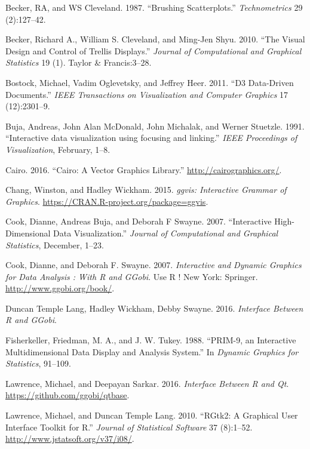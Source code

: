 \documentclass[12pt,]{article}
\theoremstyle{definition}
\theoremstyle{definition}
\theoremstyle{definition}
\theoremstyle{remark}
\begin{document}
\leavevmode\hypertarget{ref-brushing-scatterplots}{}%
Becker, RA, and WS Cleveland. 1987. ``Brushing Scatterplots.''
\emph{Technometrics} 29 (2):127--42.

\leavevmode\hypertarget{ref-trellis}{}%
Becker, Richard A., William S. Cleveland, and Ming-Jen Shyu. 2010. ``The
Visual Design and Control of Trellis Displays.'' \emph{Journal of
Computational and Graphical Statistics} 19 (1). Taylor \& Francis:3--28.

\leavevmode\hypertarget{ref-d3}{}%
Bostock, Michael, Vadim Oglevetsky, and Jeffrey Heer. 2011. ``D3
Data-Driven Documents.'' \emph{IEEE Transactions on Visualization and
Computer Graphics} 17 (12):2301--9.

\leavevmode\hypertarget{ref-Buja:1991vh}{}%
Buja, Andreas, John Alan McDonald, John Michalak, and Werner Stuetzle.
1991. ``Interactive data visualization using focusing and linking.''
\emph{IEEE Proceedings of Visualization}, February, 1--8.

\leavevmode\hypertarget{ref-cairo}{}%
Cairo. 2016. ``Cairo: A Vector Graphics Library.''
\url{http://cairographics.org/}.

\leavevmode\hypertarget{ref-ggvis}{}%
Chang, Winston, and Hadley Wickham. 2015. \emph{ggvis: Interactive
Grammar of Graphics}. \url{https://CRAN.R-project.org/package=ggvis}.

\leavevmode\hypertarget{ref-Cook:2007uk}{}%
Cook, Dianne, Andreas Buja, and Deborah F Swayne. 2007. ``Interactive
High-Dimensional Data Visualization.'' \emph{Journal of Computational
and Graphical Statistics}, December, 1--23.

\leavevmode\hypertarget{ref-ggobi:2007}{}%
Cook, Dianne, and Deborah F. Swayne. 2007. \emph{Interactive and Dynamic
Graphics for Data Analysis : With R and GGobi}. Use R ! New York:
Springer. \url{http://www.ggobi.org/book/}.

\leavevmode\hypertarget{ref-rggobi}{}%
Duncan Temple Lang, Hadley Wickham, Debby Swayne. 2016. \emph{Interface
Between R and GGobi}.

\leavevmode\hypertarget{ref-PRIM9}{}%
Fisherkeller, Friedman, M. A., and J. W. Tukey. 1988. ``PRIM-9, an
Interactive Multidimensional Data Display and Analysis System.'' In
\emph{Dynamic Graphics for Statistics}, 91--109.

\leavevmode\hypertarget{ref-qtbase}{}%
Lawrence, Michael, and Deepayan Sarkar. 2016. \emph{Interface Between R
and Qt}. \url{https://github.com/ggobi/qtbase}.

\leavevmode\hypertarget{ref-RGtk2}{}%
Lawrence, Michael, and Duncan Temple Lang. 2010. ``RGtk2: A Graphical
User Interface Toolkit for R.'' \emph{Journal of Statistical Software}
37 (8):1--52. \url{http://www.jstatsoft.org/v37/i08/}.
\end{document}
